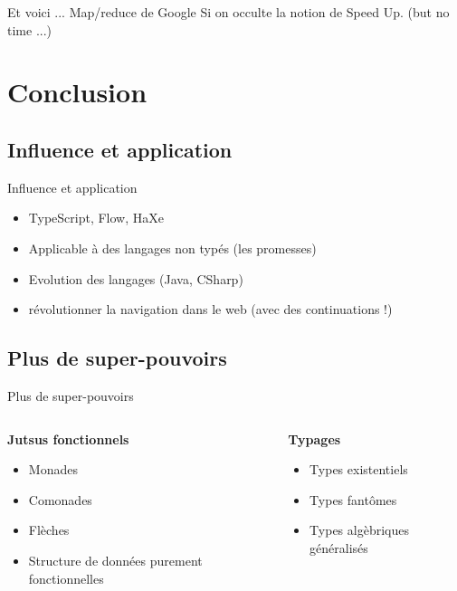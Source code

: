 \documentclass{beamer}
\newcommand{\adjustimg}{%
  \checkoddpage%
  \ifoddpage\hspace*{
		\dimexpr\evensidemargin-\oddsidemargin}\else\hspace*{
			-\dimexpr\evensidemargin-\oddsidemargin}\fi%
}
\newcommand{\centerimg}[2][width=\textwidth]{%
  \makebox[\textwidth]{\adjustimg\texttt{[image: \#2]}}%
}
\begin{document}
      \begin{frame}
        \centerimg[width=150pt, height=220pt]{figures/mapreduce.pdf}
      \end{frame}

      \begin{frame}{Et voici ... Map/reduce de Google}
        Si on occulte la notion de Speed Up. (but no time ...)

      \end{frame}


  \section{Conclusion}
  \subsection{Influence et application}

  \begin{frame}{Influence et application}

    \begin{itemize}
      \item TypeScript, Flow, HaXe
      \item Applicable à des langages non typés (les promesses)
      \item Evolution des langages (Java, CSharp)
      \item révolutionner la navigation dans le web (avec des continuations !)
    \end{itemize}

  \end{frame}

  \subsection{Plus de super-pouvoirs}

  \begin{frame}{Plus de super-pouvoirs}
    \begin{columns}[t]
      \begin{column}{5cm}
        \textbf{Jutsus fonctionnels}
        \begin{itemize}
          \item Monades
          \item Comonades
          \item Flèches
          \item Structure de données purement fonctionnelles
        \end{itemize}
      \end{column}
      \begin{column}{5cm}
        \textbf{Typages}
        \begin{itemize}
          \item Types existentiels
          \item Types fantômes
          \item Types algèbriques généralisés
        \end{itemize}
      \end{column}
    \end{columns}

  \end{frame}
\end{document}
